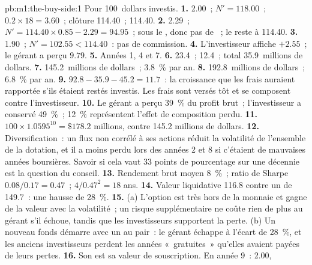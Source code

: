\begin{solution}{pb:m1:the-buy-side:1}
Pour 100~dollars investis.
\textbf{1.}  2.00~; $N' = 118.00$~;  $0.2 \times 18 = 3.60$~;
clôture 114.40~;  114.40.
\textbf{2.}  2.29~; $N' = 114.40\times0.85 - 2.29 = 94.95$~; sous
le , donc pas de ~; le  reste à 114.40.
\textbf{3.}  1.90~; $N' = 102.55 < 114.40$~: pas de commission.
\textbf{4.} L'investisseur affiche $+2.55$~; le gérant a perçu $9.79$.
\textbf{5.} Années 1, 4 et 7.
\textbf{6.}  23.4~;  12.4~; total 35.9~millions de dollars.
\textbf{7.} 145.2~millions de dollars~; 3.8~\% par an.
\textbf{8.} 192.8~millions de dollars~; 6.8~\% par an.
\textbf{9.} $92.8 - 35.9 - 45.2 = 11.7$~: la croissance que les frais auraient
rapportée s'ils étaient restés investis. Les frais sont versés tôt et se composent contre
l'investisseur.
\textbf{10.} Le gérant a perçu 39~\% du profit brut~; l'investisseur
a conservé 49~\%~; 12~\% représentent l'effet de composition perdu.
\textbf{11.} $100 \times 1.0595^{10} = \$178.2$ millions, contre 145.2
millions de dollars.
\textbf{12.} Diversification~: un flux non corrélé à ses actions réduit
la volatilité de l'ensemble de la dotation, et il a moins perdu lors des années 2 et 8 si
c'étaient de mauvaises années boursières. Savoir si cela vaut 33 points de pourcentage sur
une décennie est la question du conseil.
\textbf{13.} Rendement brut moyen 8~\%~; ratio de Sharpe $0.08/0.17 = 0.47$~;
$4/0.47^2 = 18$ ans.
\textbf{14.} Valeur liquidative 116.8 contre un  de 149.7~: une hausse de 28~\%.
\textbf{15.} (a) L'option est très hors de la monnaie et gagne de la valeur avec
la volatilité~; un risque supplémentaire ne coûte rien de plus au gérant s'il échoue, tandis que
les investisseurs supportent la perte. (b) Un nouveau fonds démarre avec un  au pair~: le
gérant échappe à l'écart de 28~\%, et les anciens investisseurs perdent les années «~gratuites~»
qu'elles avaient payées de leurs pertes.
\textbf{16.} Son  est sa valeur de souscription. En année 9~:  2.00,

\end{solution}

